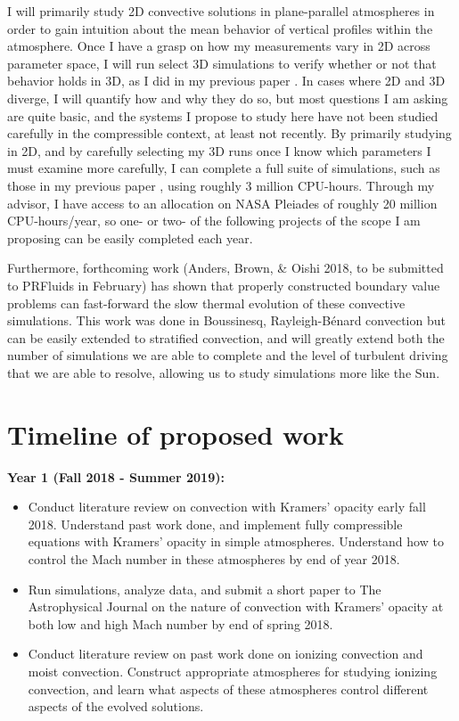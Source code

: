 \documentclass[aasms,12pt]{article}
\newcommand{\RB}{Rayleigh-B\'{e}nard }
\begin{document}
I will primarily study 2D convective solutions in plane-parallel atmospheres in order to gain
intuition about the mean behavior of vertical profiles within the atmosphere.  Once I have a grasp
on how my measurements vary in 2D across parameter space, I will run select 3D simulations to
verify whether or not that behavior holds in 3D, as I did in my previous paper \citep{anders&brown2017}.
In cases where 2D and 3D diverge, I will quantify how and why they do so, but most questions I am
asking are quite basic, and the systems I propose to study here have not been studied
carefully in the compressible context, at least not recently.  By primarily studying in 2D, and by carefully
selecting my 3D runs once I know which parameters I must examine more carefully, I can complete
a full suite of simulations, such as those in my previous paper \citep{anders&brown2017}, using
roughly 3 million CPU-hours.  Through my advisor, I have access to an allocation on NASA Pleiades
of roughly 20 million CPU-hours/year, so one- or two- of the following projects of the scope I am
proposing can be easily completed each year.

Furthermore, forthcoming work (Anders, Brown, \& Oishi 2018, to be submitted to PRFluids in February) 
has shown that properly constructed boundary value problems 
can fast-forward the slow thermal evolution of these convective simulations.  This work was done in 
Boussinesq, \RB convection but can be easily extended to stratified convection, and will greatly
extend both the number of simulations we are able to complete and the level of turbulent driving
that we are able to resolve, allowing us to study simulations more like the Sun.



\section{Timeline of proposed work}
\textbf{Year 1 (Fall 2018 - Summer 2019):}
\begin{itemize}
\vspace{-0.2cm}
\item Conduct literature review on convection with Kramers' opacity early fall 2018.  
Understand past work done, and implement fully compressible equations with Kramers'
opacity in simple atmospheres.  Understand how to control the Mach number in these
atmospheres by end of year 2018.
\vspace{-0.2cm}
\item Run simulations, analyze data, and submit a short paper to The Astrophysical Journal
on the nature of convection with Kramers' opacity at both low and high Mach number by
end of spring 2018.
\vspace{-0.2cm}
\item Conduct literature review on past work done on ionizing convection and moist convection.
Construct appropriate atmospheres for studying ionizing convection, and learn what aspects of
these atmospheres control different aspects of the evolved solutions.
\end{itemize}
\end{document}
